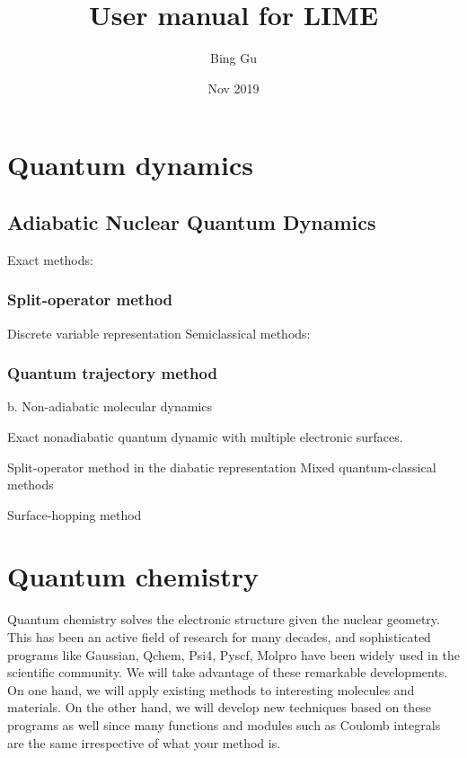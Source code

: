 \documentclass[a4paper,12pt]{book}
\begin{document}
\author{Bing Gu}
\title{User manual for LIME} 
\date{Nov 2019}

\frontmatter
\maketitle
\tableofcontents

\mainmatter
%
%




\chapter{Quantum dynamics} 

\section{ Adiabatic Nuclear Quantum Dynamics}

Exact methods:

\subsection{Split-operator method} 
Discrete variable representation
Semiclassical methods:

\subsection{Quantum trajectory method} 
b. Non-adiabatic molecular dynamics

Exact nonadiabatic quantum dynamic with multiple electronic surfaces.

Split-operator method in the diabatic representation
Mixed quantum-classical methods

Surface-hopping method
\chapter{Quantum chemistry} 
Quantum chemistry solves the electronic structure given the nuclear geometry. This has been an active field of research for many decades, and sophisticated programs like Gaussian, Qchem, Psi4, Pyscf, Molpro have been widely used in the scientific community. We will take advantage of these remarkable developments. On one hand, we will apply existing methods to interesting molecules and materials. On the other hand, we will develop new techniques based on these programs as well since many functions and modules such as Coulomb integrals are the same irrespective of what your method is.
\end{document}
